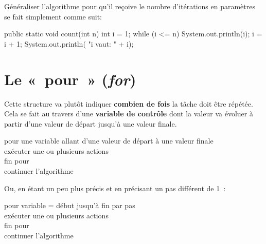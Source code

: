 		Généraliser l'algorithme pour qu'il reçoive le nombre
		d'itérations en paramètres se fait simplement comme suit:
		
		\begin{java}
public static void count(int n){
	int i = 1;
	while (i <= n){
		System.out.println(i);
		i = i + 1;
	}
	System.out.println(
		"i vaut: " + i);
}				
	\end{java}


	\section{Le «~pour~» (\textit{for})}
	
	Cette structure va plutôt indiquer \textbf{combien de fois} la tâche doit
	être répétée.  Cela se fait au travers d’une \textbf{variable de contrôle}
	dont la valeur va évoluer à partir d’une valeur de départ jusqu’à une valeur
	finale.

	\begin{langagenaturel}
		pour une variable allant d'une valeur de départ à une valeur finale\\
		\tab exécuter une ou plusieurs actions\\
		fin pour \\
		continuer l'algorithme 
	\end{langagenaturel}

	Ou, en étant un peu plus précis et en précisant un pas différent de 1~:

	\begin{langagenaturel}
		pour variable = début jusqu'à fin par pas\\
		\tab exécuter une ou plusieurs actions\\
		fin pour \\
		continuer l'algorithme 
	\end{langagenaturel}


